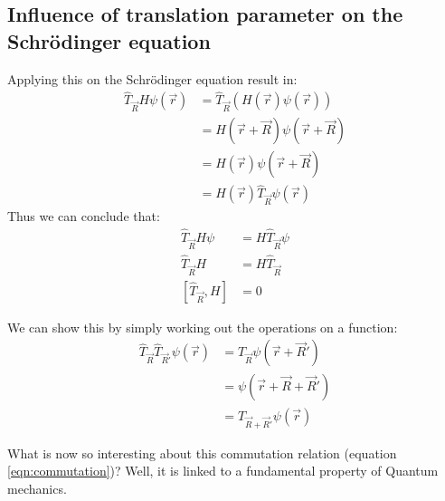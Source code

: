 \begin{RECAP}
\section{Influence of translation parameter on the Schrödinger equation}
Applying this on the Schrödinger equation result in:
\begin{align}
	\hat{T}_{\vec{R}}H\psi(\vec{r}) &= \hat{T}_{\vec{R}}(H(\vec{r})\psi(\vec{r}))\\
	&= H(\vec{r} + \vec{R})\psi(\vec{r} + \vec{R})\\
	&= H(\vec{r})\psi(\vec{r} + \vec{R})\\
	&= H(\vec{r})\hat{T}_{\vec{R}}\psi(\vec{r})
\end{align}
Thus we can conclude that:
\begin{align}
	\hat{T}_{\vec{R}}H\psi &= H\hat{T}_{\vec{R}}\psi \\
	\hat{T}_{\vec{R}}H &= H\hat{T}_{\vec{R}} \\
	\left[\hat{T}_{\vec{R}}, H\right] &= 0 \label{eqn:commutation}
\end{align}
\begin{myproof}
	We can show this by simply working out the operations on a function:
	\begin{align}
		\hat{T}_{\vec{R}}\hat{T}_{\vec{R}'}\psi(\vec{r}) &= \hat{T}_{\vec{R}}\psi(\vec{r} + \vec{R}') \\
		&= \psi(\vec{r} + \vec{R} + \vec{R}') \\
		&= \hat{T}_{\vec{R} + \vec{R}'}\psi(\vec{r})
	\end{align}
\end{myproof}
What is now so interesting about this commutation relation (equation \ref{eqn:commutation})? Well, it is linked to a fundamental property of Quantum mechanics.
\end{RECAP}
